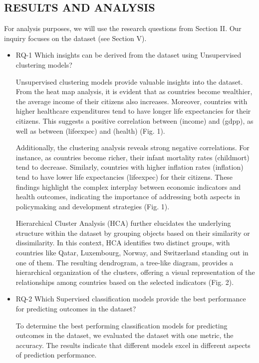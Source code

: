 \documentclass{article}
\begin{document}
\begin{multicols}{2}
\section{RESULTS AND ANALYSIS}
For analysis purposes, we will use the research questions from Section II. Our inquiry focuses on the dataset (see Section V).

\begin{itemize}
\setlength{\parindent}{3em}
    \item RQ-1	Which insights can be derived from the dataset using Unsupervised clustering models?
    
Unsupervised clustering models provide valuable insights into the dataset. From the heat map analysis, it is evident that as countries become wealthier, the average income of their citizens also increases. Moreover, countries with higher healthcare expenditures tend to have longer life expectancies for their citizens. This suggests a positive correlation between (income) and (gdpp), as well as between (lifeexpec) and (health) (Fig. 1).

Additionally, the clustering analysis reveals strong negative correlations. For instance, as countries become richer, their infant mortality rates (childmort) tend to decrease. Similarly, countries with higher inflation rates (inflation) tend to have lower life expectancies (lifeexpec) for their citizens. These findings highlight the complex interplay between economic indicators and health outcomes, indicating the importance of addressing both aspects in policymaking and development strategies (Fig. 1).

Hierarchical Cluster Analysis (HCA) further elucidates the underlying structure within the dataset by grouping objects based on their similarity or dissimilarity. In this context, HCA identifies two distinct groups, with countries like Qatar, Luxembourg, Norway, and Switzerland standing out in one of them. The resulting dendrogram, a tree-like diagram, provides a hierarchical organization of the clusters, offering a visual representation of the relationships among countries based on the selected indicators (Fig. 2).

    \item RQ-2	Which Supervised classification models provide the best performance for predicting outcomes in the dataset?
    
To determine the best performing classification models for predicting outcomes in the dataset, we evaluated the dataset with one metric, the accuracy. The results indicate that different models excel in different aspects of prediction performance.


\end{itemize}
\end{multicols}
\end{document}
